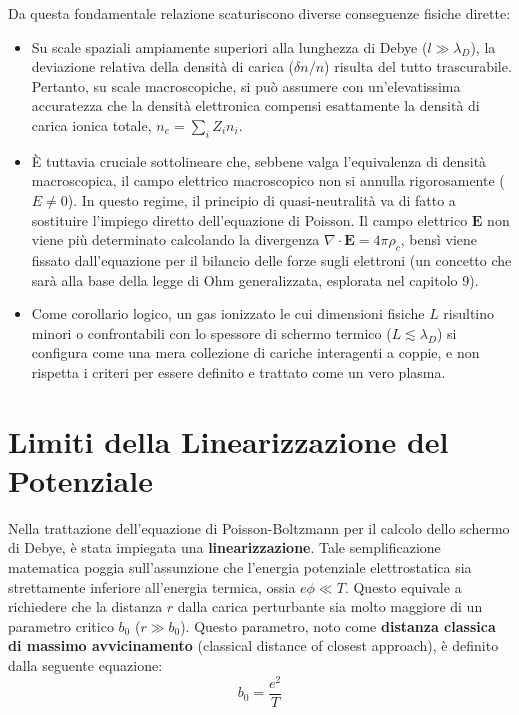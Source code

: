 Da questa fondamentale relazione scaturiscono diverse conseguenze fisiche dirette:
\begin{itemize}
\item Su scale spaziali ampiamente superiori alla lunghezza di Debye ($l \gg \lambda_D$), la deviazione relativa della densità di carica ($\delta n / n$) risulta del tutto trascurabile. Pertanto, su scale macroscopiche, si può assumere con un'elevatissima accuratezza che la densità elettronica compensi esattamente la densità di carica ionica totale, $n_e = \sum_i Z_i n_i$.
\item È tuttavia cruciale sottolineare che, sebbene valga l'equivalenza di densità macroscopica, il campo elettrico macroscopico non si annulla rigorosamente ($E \neq 0$). In questo regime, il principio di quasi-neutralità va di fatto a sostituire l'impiego diretto dell'equazione di Poisson. Il campo elettrico $\mathbf{E}$ non viene più determinato calcolando la divergenza $\nabla \cdot \mathbf{E} = 4\pi \rho_c$, bensì viene fissato dall'equazione per il bilancio delle forze sugli elettroni (un concetto che sarà alla base della legge di Ohm generalizzata, esplorata nel capitolo 9).
\item Come corollario logico, un gas ionizzato le cui dimensioni fisiche $L$ risultino minori o confrontabili con lo spessore di schermo termico ($L \lesssim \lambda_D$) si configura come una mera collezione di cariche interagenti a coppie, e non rispetta i criteri per essere definito e trattato come un vero plasma.
\end{itemize}

\section{Limiti della Linearizzazione del Potenziale}

Nella trattazione dell'equazione di Poisson-Boltzmann per il calcolo dello schermo di Debye, è stata impiegata una \textbf{linearizzazione}. Tale semplificazione matematica poggia sull'assunzione che l'energia potenziale elettrostatica sia strettamente inferiore all'energia termica, ossia $e\phi \ll T$. Questo equivale a richiedere che la distanza $r$ dalla carica perturbante sia molto maggiore di un parametro critico $b_0$ ($r \gg b_0$). Questo parametro, noto come \textbf{distanza classica di massimo avvicinamento} (classical distance of closest approach), è definito dalla seguente equazione:
\begin{equation}
b_0 = \frac{e^2}{T}
\end{equation}

